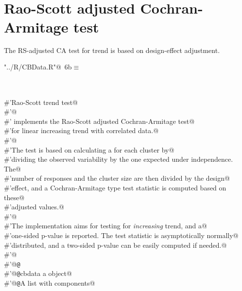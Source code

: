 \documentclass[reqno]{amsart}
\renewcommand{\NWtarget}[2]{\hypertarget{#1}{#2}}
\begin{document}
\section{Rao-Scott adjusted Cochran-Armitage test}
The RS-adjusted CA test for trend is based on design-effect adjustment.

\begin{flushleft} \small\label{scrap10}\raggedright\small
\NWtarget{nuweb6b}{} \verb@"../R/CBData.R"@\nobreak\ {\footnotesize {6b}}$\equiv$
\vspace{-1ex}
\begin{list}{}{} \item
\mbox{}\verb@@\\
\mbox{}\verb@@\\
\mbox{}\verb@#'Rao-Scott trend test@\\
\mbox{}\verb@#'@\\
\mbox{}\verb@#' implements the Rao-Scott adjusted Cochran-Armitage test@\\
\mbox{}\verb@#'for linear increasing trend with correlated data.@\\
\mbox{}\verb@#'@\\
\mbox{}\verb@#'The test is based on calculating a  for each cluster by@\\
\mbox{}\verb@#'dividing the observed variability by the one expected under independence. The@\\
\mbox{}\verb@#'number of responses and the cluster size are then divided by the design@\\
\mbox{}\verb@#'effect, and a Cochran-Armitage type test statistic is computed based on these@\\
\mbox{}\verb@#'adjusted values.@\\
\mbox{}\verb@#'@\\
\mbox{}\verb@#'The implementation aims for testing for \emph{increasing} trend, and a@\\
\mbox{}\verb@#'one-sided p-value is reported. The test statistic is asymptotically normally@\\
\mbox{}\verb@#'distributed, and a two-sided p-value can be easily computed if needed.@\\
\mbox{}\verb@#'@\\
\mbox{}\verb@#'@{\tt @}\verb@export@\\
\mbox{}\verb@#'@{\tt @}\verb@param cbdata a  object@\\
\mbox{}\verb@#'@{\tt @}\verb@return A list with components@\\

\end{list}
\end{flushleft}
\end{document}
